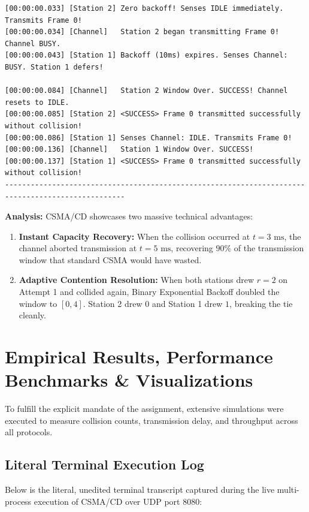 \documentclass[12pt, a4paper]{article}
\begin{document}
\begin{scriptsize}
\begin{verbatim}
[00:00:00.033] [Station 2] Zero backoff! Senses IDLE immediately. Transmits Frame 0!
[00:00:00.034] [Channel]   Station 2 began transmitting Frame 0! Channel BUSY.
[00:00:00.043] [Station 1] Backoff (10ms) expires. Senses Channel: BUSY. Station 1 defers!

[00:00:00.084] [Channel]   Station 2 Window Over. SUCCESS! Channel resets to IDLE.
[00:00:00.085] [Station 2] <SUCCESS> Frame 0 transmitted successfully without collision!
[00:00:00.086] [Station 1] Senses Channel: IDLE. Transmits Frame 0!
[00:00:00.136] [Channel]   Station 1 Window Over. SUCCESS!
[00:00:00.137] [Station 1] <SUCCESS> Frame 0 transmitted successfully without collision!
--------------------------------------------------------------------------------------------------
\end{verbatim}
\end{scriptsize}

\textbf{Analysis:} CSMA/CD showcases two massive technical advantages:
\begin{enumerate}
    \item \textbf{Instant Capacity Recovery:} When the collision occurred at $t = 3\text{ ms}$, the channel aborted transmission at $t = 5\text{ ms}$, recovering $90\%$ of the transmission window that standard CSMA would have wasted.
    \item \textbf{Adaptive Contention Resolution:} When both stations drew $r = 2$ on Attempt 1 and collided again, Binary Exponential Backoff doubled the window to $[0, 4]$. Station 2 drew $0$ and Station 1 drew $1$, breaking the tie cleanly.
\end{enumerate}


\section{Empirical Results, Performance Benchmarks \& Visualizations}

To fulfill the explicit mandate of the assignment, extensive simulations were executed to measure collision counts, transmission delay, and throughput across all protocols.

\subsection{Literal Terminal Execution Log}
Below is the literal, unedited terminal transcript captured during the live multi-process execution of CSMA/CD over UDP port 8080:
\end{document}
